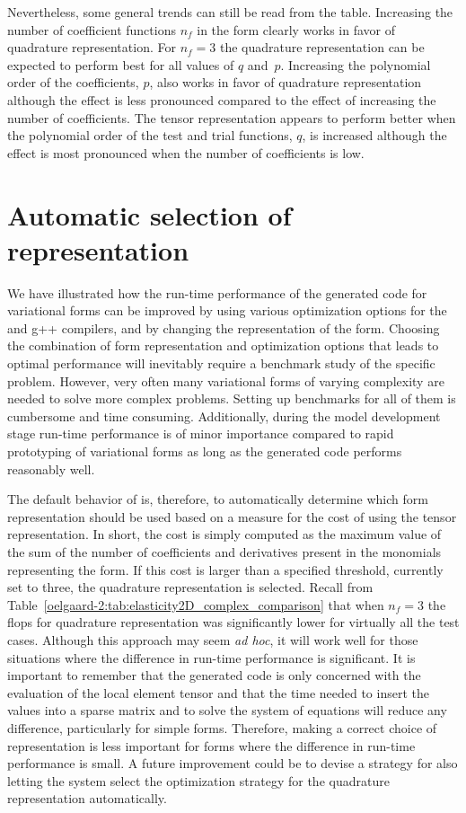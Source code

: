 Nevertheless, some general trends can still be read from the table.
Increasing the number of coefficient functions $n_f$ in the form
clearly works in favor of quadrature representation.  For $n_{f}=3$
the quadrature representation can be expected to perform best for all
values of $q$ and~$p$.  Increasing the polynomial order of
the coefficients, $p$, also works in favor of quadrature representation
although the effect is less pronounced compared to the effect of
increasing the number of coefficients.  The tensor representation
appears to perform better when the polynomial order of the test and
trial functions, $q$, is increased although the effect is most
pronounced when the number of coefficients is low.

\section{Automatic selection of representation}

We have illustrated how the run-time performance of the generated code
for variational forms can be improved by using various optimization
options for the \ffc{} and g++ compilers, and by changing the
representation of the form.  Choosing the combination of form
representation and optimization options that leads to optimal
performance will inevitably require a benchmark study of the specific
problem.  However, very often many variational forms of varying
complexity are needed to solve more complex problems. Setting up
benchmarks for all of them is cumbersome and time consuming.
Additionally, during the model development stage run-time performance
is of minor importance compared to rapid prototyping of variational
forms as long as the generated code performs reasonably well.

The default behavior of \ffc{} is, therefore, to automatically
determine which form representation should be used based on a measure
for the cost of using the tensor representation.  In short, the cost
is simply computed as the maximum value of the sum of the number of
coefficients and derivatives present in the monomials representing the
form.  If this cost is larger than a specified threshold, currently
set to three, the quadrature representation is selected.  Recall from
Table~\ref{oelgaard-2:tab:elasticity2D_complex_comparison} that when
$n_f=3$ the flops for quadrature representation was significantly
lower for virtually all the test cases.  Although this approach may
seem \emph{ad hoc}, it will work well for those situations where the
difference in run-time performance is significant.  It is important to
remember that the generated code is only concerned with the evaluation
of the local element tensor and that the time needed to insert the
values into a sparse matrix and to solve the system of equations will
reduce any difference, particularly for simple forms.  Therefore,
making a correct choice of representation is less important for forms
where the difference in run-time performance is small.  A future
improvement could be to devise a strategy for also letting the system
select the optimization strategy for the quadrature representation
automatically.
